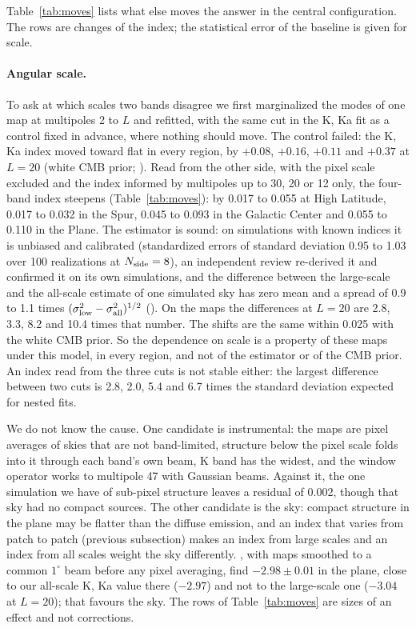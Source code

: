 Table~\ref{tab:moves} lists what else moves the answer in the central configuration. The rows are
changes of the index; the statistical error of the baseline is given for scale.

\paragraph{Angular scale.} To ask at which scales two bands disagree we first marginalized the modes of
one map at multipoles 2 to $L$ and refitted, with the same cut in the K, Ka fit as a control fixed in
advance, where nothing should move. The control failed: the K, Ka index moved toward flat in every
region, by $+0.08$, $+0.16$, $+0.11$ and $+0.37$ at $L = 20$ (white CMB prior; ). Read from
the other side, with the pixel scale excluded and the index informed by multipoles up to 30, 20 or 12
only, the four-band index steepens (Table~\ref{tab:moves}): by 0.017 to 0.055 at High
Latitude, 0.017 to 0.032 in the Spur, 0.045 to 0.093 in the Galactic Center
and 0.055 to 0.110 in the Plane. The estimator is sound: on simulations with known indices it
is unbiased and calibrated (standardized errors of standard deviation 0.95 to 1.03 over 100
realizations at $N_{\rm side}=8$), an independent review re-derived it and confirmed it on its own
simulations, and the difference between the large-scale and the all-scale estimate of one simulated
sky has zero mean and a spread of 0.9 to 1.1 times $(\sigma_{\rm low}^2 - \sigma_{\rm all}^2)^{1/2}$
(). On the maps the differences at $L = 20$ are 2.8, 3.3, 8.2 and 10.4 times that number. The
shifts are the same within 0.025 with the white CMB prior. So the dependence on scale is a property of
these maps under this model, in every region, and not of the estimator or of the CMB prior. An index
read from the three cuts is not stable either: the largest difference between two cuts is
2.8, 2.0, 5.4 and 6.7 times the standard deviation expected for nested fits.

We do not know the cause. One candidate is instrumental: the maps are pixel averages of skies that are
not band-limited, structure below the pixel scale folds into it through each band's own beam, K band
has the widest, and the window operator works to multipole 47 with Gaussian beams. Against it, the one
simulation we have of sub-pixel structure leaves a residual of 0.002, though that sky had no compact
sources. The other candidate is the sky: compact structure in the plane may be flatter than the diffuse
emission, and an index that varies from patch to patch (previous subsection) makes an index from
large scales and an index from all scales weight the sky differently. \citet{fuskeland2014}, with maps
smoothed to a common $1^\circ$ beam before any pixel averaging, find $-2.98 \pm 0.01$ in the plane,
close to our all-scale K, Ka value there ($-2.97$) and not to the large-scale one ($-3.04$ at
$L = 20$); that favours the sky. The rows of Table~\ref{tab:moves} are sizes of an effect and not
corrections.

